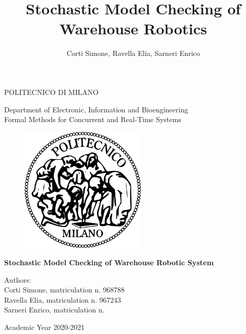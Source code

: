 \documentclass{article}
\title{Stochastic Model Checking of Warehouse Robotics}
\author{Corti Simone, Ravella Elia, Sarneri Enrico}
\begin{document}
	\begin{titlepage}

		\thispagestyle{empty}
		\vspace*{-1.5cm} \bfseries{
			\begin{center}
				\LARGE
				POLITECNICO DI MILANO\\
				\vspace*{.3truecm}
				
				\large				
				Department of Electronic, Information and Bioengineering\\
				\vspace*{.1truecm}
				Formal Methods for Concurrent and Real-Time Systems\\
				\vspace*{.75truecm}
				
				\begin{figure}[htbp]
					\begin{center}
						\includegraphics[width=6cm]{./Images/logo_poli.png}
					\end{center}
				\end{figure}
				
				\vspace*{0.8cm} 
				\LARGE
				\textbf{Stochastic Model Checking of Warehouse Robotic System}\\
				\vspace*{4.5truecm}
			\end{center}
		}
		
		\mdseries
		
		\begin{center}
			\large
			Authors:\\ Corti Simone, matriculation n. 968788 \\ 
			Ravella Elia, matriculation n. 967243 \\
			Sarneri Enrico, matriculation n. \\

			\vspace*{1cm}

			Academic Year 2020-2021
		\end{center} 

    \end{titlepage}
	\clearpage
	
\end{document}
